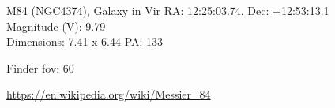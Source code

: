 \begin{block}{M84 (NGC4374), Galaxy in Vir}
    RA: 12:25:03.74, Dec: +12:53:13.1 \\ 
    Magnitude (V): 9.79 \\ 
    Dimensions: 7.41 x 6.44 PA: 133 

    Finder fov: 60 

    \url{https://en.wikipedia.org/wiki/Messier_84} 
\end{block}
